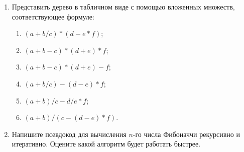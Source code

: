 \begin{enumerate}
    \item Представить дерево в табличном виде с помощью вложенных множеств, соответствующее формуле:
    \begin{enumerate}
        \item $(a+b/c)*(d-e*f)$;
        \item $(a+b-c)*(d+e)*f$;
        \item $(a+b-c)*(d+e)-f$;
        \item $(a+b/c)-(d-e)*f$;
        \item $(a+b)/c-d/e*f$;
        \item $(a+b)/(c-(d-e)*f)$.
    \end{enumerate}

    \item Напишите псевдокод для вычисления $n$-го числа Фибоначчи рекурсивно и итеративно. Оцените какой алгоритм будет работать быстрее.
\end{enumerate}
